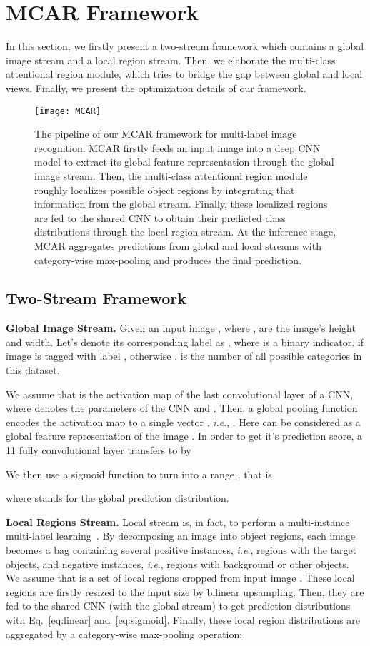 \documentclass[journal]{IEEEtran}
\makeatletter
\DeclareRobustCommand\onedot{\@onedot}
\def\@onedot{.}
\def\ie{\emph{i.e}\onedot}
\makeatother
\begin{document}
\section{MCAR Framework}\label{mcarf}
In this section, we firstly present a two-stream framework which contains a global image stream and a local region stream. Then, we elaborate the multi-class attentional region module, which tries to bridge the gap between global and local views. Finally, we present the optimization details of our framework.

\begin{figure*}[t]
 \centering
 {\texttt{[image: MCAR]}}
\caption{The pipeline of our MCAR framework for multi-label image recognition. MCAR firstly feeds an input image into a deep CNN model to extract its global feature representation through the global image stream. Then, the multi-class attentional region module roughly localizes possible object regions by integrating that information from the global stream. Finally, these localized regions are fed to the shared CNN to obtain their predicted class distributions through the local region stream. At the inference stage, MCAR aggregates predictions from global and local streams with category-wise max-pooling and produces the final prediction.}\label{fig:pipeline}
\end{figure*}

\subsection{Two-Stream Framework}
\noindent \textbf{Global Image Stream.}  
Given an input image , where ,  are the image's height and width. Let's denote its corresponding label as , where  is a binary indicator.  if image  is tagged with label , otherwise .  is the number of all possible categories in this dataset.
 
We assume that  is the activation map of the last convolutional layer of a CNN, where  denotes the parameters of the CNN and . Then, a global pooling function  encodes the activation map  to a single vector , \ie, . Here  can be considered as a global feature representation of the image . In order to get it's prediction score, a 11 fully convolutional layer transfers  to  by
 
 We then use a sigmoid function  to turn  into a range , that is 
 
 where  stands for the global prediction distribution.
 
\noindent \textbf{Local Regions Stream.} 
Local stream is, in fact, to perform a multi-instance multi-label learning~\cite{zhou2012multi}. By decomposing an image into object regions, each image becomes a bag containing several positive instances, \ie, regions
with the target objects, and negative instances, \ie, regions with background or other objects. We assume that  is a set of  local regions cropped from input image . These local regions are firstly resized to the input size by bilinear upsampling. Then, they are fed to the shared CNN (with the global stream) to get prediction distributions  with Eq.~\ref{eq:linear} and~\ref{eq:sigmoid}. Finally, these local region distributions are aggregated by a category-wise max-pooling operation:
 
\end{document}
